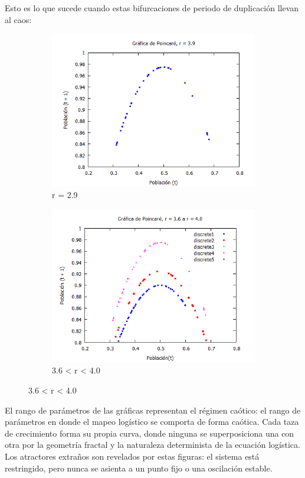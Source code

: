 \documentclass[a4paper]{article}
\begin{document}
Esto es lo que sucede cuando estas bifurcaciones de periodo de duplicación llevan al caos:

\begin{figure}[ht!]
\begin{subfigure}{0.6\textwidth}
  \centering
  \includegraphics[width=0.8\linewidth]{Poincare39.png}
   \caption{r = 2.9}
\end{subfigure}
\begin{subfigure}{0.6\textwidth}
  \centering
  \includegraphics[width=0.8\linewidth]{Poincare36-4.png}
  \caption{3.6 < r < 4.0}
\end{subfigure}
\end{figure}

El rango de parámetros de las gráficas representan el régimen caótico: el rango de parámetros en donde el mapeo logístico se comporta de forma caótica. Cada taza de crecimiento forma su propia curva, donde ninguna se superposiciona una con otra por la geometría fractal y la naturaleza determinista de la ecuación logística. Los atractores extraños son revelados por estas figuras: el sistema está restringido, pero nunca se asienta a un punto fijo o una oscilación estable. 
\end{document}
